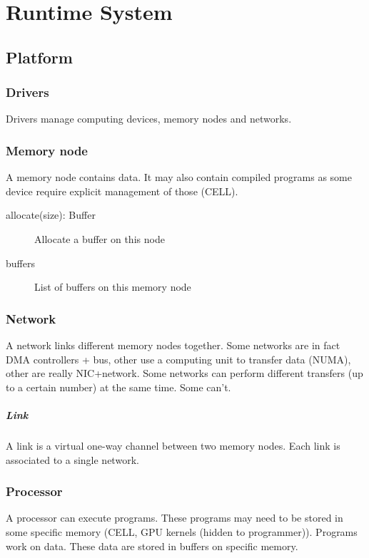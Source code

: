 \chapter{Runtime System}

\section{Platform}

\subsection{Drivers}
Drivers manage computing devices, memory nodes and networks.


\subsection{Memory node}
A memory node contains data.
It may also contain compiled programs as some device require explicit management of those (CELL).

\begin{description}
  \item[allocate(size): Buffer] Allocate a buffer on this node
  \item[buffers] List of buffers on this memory node
\end{description}

\subsection{Network}
A network links different memory nodes together.
Some networks are in fact DMA controllers + bus, other use a computing unit to transfer data (NUMA), other are really NIC+network. 
Some networks can perform different transfers (up to a certain number) at the same time. Some can't.


\paragraph{Link}
A link is a virtual one-way channel between two memory nodes. Each link is associated to a single network.


\subsection{Processor}
A processor can execute programs. These programs may need to be stored in some specific memory (CELL, GPU kernels (hidden to programmer)).
Programs work on data. These data are stored in buffers on specific memory.


